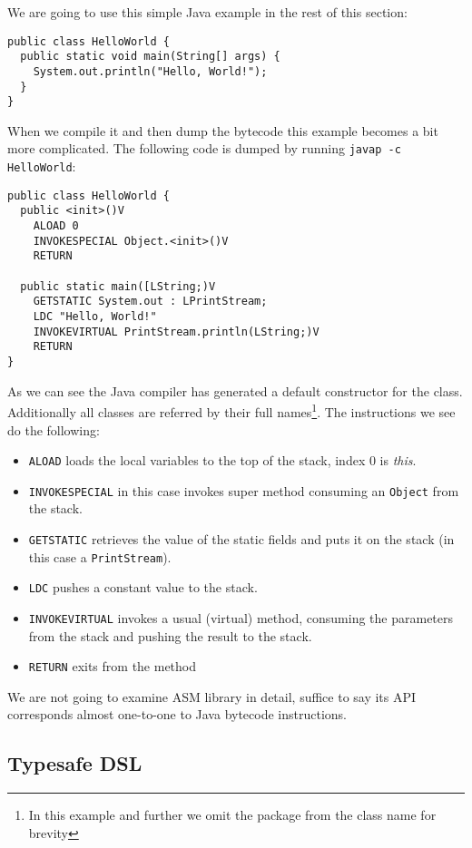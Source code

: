 \documentclass{sig-alternate}
\begin{document}
We are going to use this simple Java example in the rest of this section:

\begin{verbatim}
public class HelloWorld {
  public static void main(String[] args) {
    System.out.println("Hello, World!");
  }
}
\end{verbatim}

When we compile it and then dump the bytecode this example becomes a bit more complicated. The following code is dumped by running \verb!javap -c HelloWorld!:

\begin{verbatim}
public class HelloWorld {
  public <init>()V
    ALOAD 0
    INVOKESPECIAL Object.<init>()V
    RETURN
  
  public static main([LString;)V
    GETSTATIC System.out : LPrintStream;
    LDC "Hello, World!"
    INVOKEVIRTUAL PrintStream.println(LString;)V
    RETURN
}
\end{verbatim}

As we can see the Java compiler has generated a default constructor for the class. Additionally all classes are referred by their full names\footnote{In this example and further we omit the package from the class name for brevity}. The instructions we see do the following:
\begin{itemize}
\item \verb!ALOAD! loads the local variables to the top of the stack, index $0$ is \emph{this}.
\item \verb!INVOKESPECIAL! in this case invokes super method consuming an \verb!Object! from the stack.
\item \verb!GETSTATIC! retrieves the value of the static fields and puts it on the stack (in this case a \verb!PrintStream!).
\item \verb!LDC! pushes a constant value to the stack.
\item \verb!INVOKEVIRTUAL! invokes a usual (virtual) method, consuming the parameters from the stack and pushing the result to the stack.
\item \verb!RETURN! exits from the method
\end{itemize}

We are not going to examine ASM library in detail, suffice to say its API corresponds almost one-to-one to Java bytecode instructions.

\subsection{Typesafe DSL}
\end{document}
